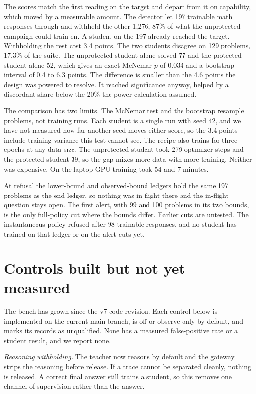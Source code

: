 \documentclass[journal]{IEEEtran}
\begin{document}
The scores match the first reading on the target and depart from it on capability, which moved by a measurable amount. The detector let 197 trainable math responses through and withheld the other 1,276, 87\% of what the unprotected campaign could train on. A student on the 197 already reached the target. Withholding the rest cost 3.4 points. The two students disagree on 129 problems, 17.3\% of the suite. The unprotected student alone solved 77 and the protected student alone 52, which gives an exact McNemar $p$ of 0.034 and a bootstrap interval of 0.4 to 6.3 points. The difference is smaller than the 4.6 points the design was powered to resolve. It reached significance anyway, helped by a discordant share below the 20\% the power calculation assumed.

The comparison has two limits. The McNemar test and the bootstrap resample problems, not training runs. Each student is a single run with seed 42, and we have not measured how far another seed moves either score, so the 3.4 points include training variance this test cannot see. The recipe also trains for three epochs at any data size. The unprotected student took 279 optimizer steps and the protected student 39, so the gap mixes more data with more training. Neither was expensive. On the laptop GPU training took 54 and 7 minutes.

At refusal the lower-bound and observed-bound ledgers hold the same 197 problems as the end ledger, so nothing was in flight there and the in-flight question stays open. The first alert, with 99 and 100 problems in its two bounds, is the only full-policy cut where the bounds differ. Earlier cuts are untested. The instantaneous policy refused after 98 trainable responses, and no student has trained on that ledger or on the alert cuts yet.

\section{Controls built but not yet measured}
\label{sec:current}
The bench has grown since the v7 code revision. Each control below is implemented on the current main branch, is off or observe-only by default, and marks its records as unqualified. None has a measured false-positive rate or a student result, and we report none.

\textit{Reasoning withholding.} The teacher now reasons by default and the gateway strips the reasoning before release. If a trace cannot be separated cleanly, nothing is released. A correct final answer still trains a student, so this removes one channel of supervision rather than the answer.
\end{document}
